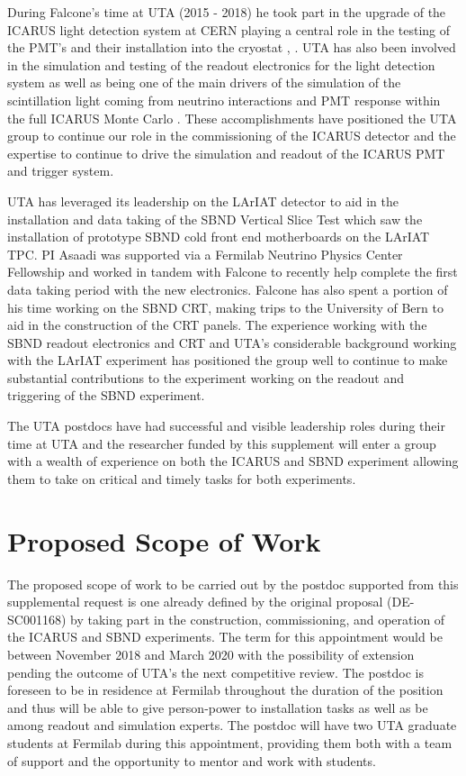 During Falcone's time at UTA (2015 - 2018) he took part in the upgrade of the ICARUS light detection system at CERN playing a central role in the testing of the PMT's and their installation into the cryostat \cite{Babicz:2018svg}, \cite{Bonesini:2018ubd}. UTA has also been involved in the simulation and testing of the readout electronics for the light detection system \cite{Bagby:2018fkj} as well as being one of the main drivers of the simulation of the scintillation light coming from neutrino interactions and PMT response within the full ICARUS Monte Carlo \cite{JPhys}. These accomplishments have positioned the UTA group to continue our role in the commissioning of the ICARUS detector and the expertise to continue to drive the simulation and readout of the ICARUS PMT and trigger system.

UTA has leveraged its leadership on the LArIAT detector to aid in the installation and data taking of the SBND Vertical Slice Test which saw the installation of prototype SBND cold front end motherboards on the LArIAT TPC. PI Asaadi was supported via a Fermilab Neutrino Physics Center Fellowship and worked in tandem with Falcone to recently help complete the first data taking period with the new electronics. Falcone has also spent a portion of his time working on the SBND CRT, making trips to the University of Bern to aid in the construction of the CRT panels. The experience working with the SBND readout electronics and CRT and UTA's considerable background working with the LArIAT experiment has positioned the group well to continue to make substantial contributions to the experiment working on the readout and triggering of the SBND experiment.

The UTA postdocs have had successful and visible leadership roles during their time at UTA and the researcher funded by this supplement will enter a group with a wealth of experience on both the ICARUS and SBND experiment allowing them to take on critical and timely tasks for both experiments.

  
\section*{Proposed Scope of Work}
The proposed scope of work to be carried out by the postdoc supported from this supplemental request is one already defined by the original proposal (DE-SC001168) by taking part in the construction, commissioning, and operation of the ICARUS and SBND experiments. The term for this appointment would be between November 2018 and March 2020 with the possibility of extension pending the outcome of UTA's the next competitive review. The postdoc is foreseen to be in residence at Fermilab throughout the duration of the position and thus will be able to give person-power to installation tasks as well as be among readout and simulation experts. The postdoc will have two UTA graduate students at Fermilab during this appointment, providing them both with a team of support and the opportunity to mentor and work with students.

